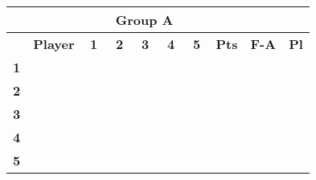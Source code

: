 \documentclass[10pt]{article}
\newcommand{\red}{\color{red}}
\newcommand{\blue}{\color{blue}}
\newcommand{\blank}{\cellcolor[gray]{.5}}
\begin{document}
\bigskip
\hspace{-1.5cm}
\begin{tabular}{|c|p{2.8cm}|c|c|c|c|c|c|c|c|}
	\multicolumn{9}{c}{\bf Group A} \\ \hline
	& \bf Player & \bf1 & \bf2 & \bf3 & \bf4 & \bf5 & \bf Pts & \bf F-A & \bf Pl \\ \hline
	\multirow{2}{*}{\bf1}&\multirow{2}{*}{}      & \blank$\quad$ & \red$\quad$ & \red$\quad$ & \red$\quad$ & \red$\quad$ &\multirow{2}{*}{}&\multirow{2}{*}{}&\multirow{2}{*}{} \\ && \blank & \red & \blue & \red & \red &&& \\ \hline
	\multirow{2}{*}{\bf2}&\multirow{2}{*}{\it}     & \blue & \blank & \red & \red & \red &\multirow{2}{*}{}&\multirow{2}{*}{}&\multirow{2}{*}{} \\      && \blue & \blank &  & \red & \red &&& \\ \hline
	\multirow{2}{*}{\bf3}&\multirow{2}{*}{\it}     & \blue & \blue & \blank & \red & \red &\multirow{2}{*}{}&\multirow{2}{*}{}&\multirow{2}{*}{} \\     && \red &  & \blank & \blue & \red &&& \\ \hline
	\multirow{2}{*}{\bf4}&\multirow{2}{*}{\it}     & \blue & \blue & \blue & \blank & \red &\multirow{2}{*}{}&\multirow{2}{*}{}&\multirow{2}{*}{} \\     && \blue & \blue & \red & \blank & \red &&& \\ \hline
	\multirow{2}{*}{\bf5}&\multirow{2}{*}{\it}     & \blue & \blue & \blue & \red & \blank &\multirow{2}{*}{}&\multirow{2}{*}{}&\multirow{2}{*}{} \\     && \blue & \blue & \red & \red & \blank &&& \\ \hline
\end{tabular}
\hspace{0.2cm}
\end{document}
